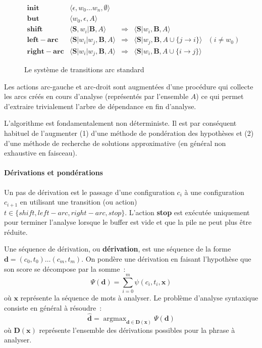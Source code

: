 \documentclass[11pt,openany]{book}
\begin{document}
\begin{figure}[htbp]
\begin{displaymath}
\begin{array}{rccll}
\mathbf{init}  &\langle \epsilon , w_0 \ldots w_n ,\emptyset \rangle\\
\mathbf{but}  & \langle w_0 ,\epsilon , A \rangle\\
\mathbf{shift} & \langle \mathbf{S} ,  w_i | \mathbf{B} , A   \rangle
&\Rightarrow &\langle \mathbf{S} | w_i ,  \mathbf{B} , A   \rangle\\
\mathbf{left-arc} &\langle \mathbf{S}|w_i | w_j , \mathbf{B} , A
\rangle &\Rightarrow& \langle \mathbf{S}| w_j , \mathbf{B} , A \cup \{
j\rightarrow i \}   \rangle & (i\not = w_0)\\
\mathbf{right-arc }  &\langle \mathbf{S}|w_i | w_j , \mathbf{B} , A   \rangle
&\Rightarrow & 
\langle \mathbf{S}| w_i , \mathbf{B} , A \cup \{
i \rightarrow j \}   \rangle
\end{array}
\end{displaymath}
\caption{\label{fig-AS}Le système de transitions arc standard}
\end{figure}


Les actions arc-gauche et arc-droit sont augmentées d'une procédure
qui collecte les arcs créés en cours d'analyse (représentés par
l'ensemble $A$) ce qui permet d'extraire trivialement l'arbre de
dépendance en fin d'analyse.

L'algorithme est fondamentalement non déterministe. Il est par
conséquent habituel de l'augmenter (1) d'une méthode de pondération des
hypothèses et (2) d'une méthode de recherche de solutions
approximative (en général non exhaustive en faisceau).

\paragraph{Dérivations et pondérations} 
Un pas de dérivation est le passage d'une configuration $c_i$ à une
configuration $c_{i+1}$ en utilisant une transition (ou action) $t\in
\{shift, left-arc,right-arc, stop\}$. L'action {\bf stop} est exécutée
uniquement pour terminer l'analyse lorsque le buffer est vide et que
la pile ne peut plus être réduite.

Une séquence de dérivation, ou {\bf dérivation}, est une séquence de la
forme $\mathbf{d} = (c_0, t_0) \ldots (c_m,t_m)$. On pondère une dérivation en
faisant l'hypothèse que son score se décompose par la somme~:
\begin{equation}
\Psi(\mathbf{d}) = \sum_{i=0}^m  \psi(c_i,t_i,\mathbf{x})
\end{equation}
où $\mathbf{x}$ représente la séquence de mots à analyser.
Le problème d'analyse syntaxique consiste en général à résoudre~:
\begin{equation}
{\mathbf{\hat{d}}} = \mathop{\text{argmax}}_{\mathbf{d} \in \mathbf{D}(\mathbf{x})} \Psi(\mathbf{d}) 
\end{equation}
où $\mathbf{D}(\mathbf{x})$ représente l'ensemble des dérivations possibles pour
la phrase à analyser.
\end{document}
